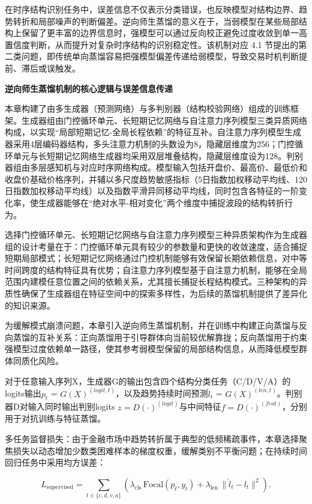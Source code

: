 在时序结构识别任务中，误差信息不仅表示分类错误，也反映模型对结构边界、趋势转折和局部噪声的判断偏差。逆向师生蒸馏的意义在于，当弱模型在某些局部结构上保留了更丰富的边界信息时，强模型可以通过反向校正避免过度收敛到单一高置信度判断，从而提升对复杂时序结构的识别稳定性。该机制对应 4.1 节提出的第二类问题，即传统单向蒸馏容易把强模型偏差传递给弱模型，导致交易时机判断提前、滞后或误触发。

\noindent\textbf{逆向师生蒸馏机制的核心逻辑与误差信息传递}\par

本章构建了由多生成器（预测网络）与多判别器（结构校验网络）组成的训练框架。生成器组由门控循环单元、长短期记忆网络与自注意力序列模型三类异质网络构成，以实现``局部短期记忆-全局长程依赖''的特征互补。自注意力序列模型生成器采用4层编码器结构，多头注意力机制的头数设为8，隐藏层维度为256；门控循环单元与长短期记忆网络生成器均采用双层堆叠结构，隐藏层维度设为128。判别器组由多层感知机与对应时序网络构成。模型输入包括开盘价、最高价、最低价和收盘价基础价格序列，并辅以多尺度趋势敏感指标（5日指数加权移动平均线、120日指数加权移动平均线）以及指数平滑异同移动平均线，同时包含各特征的一阶变化率，使生成器能够在``绝对水平-相对变化''两个维度中捕捉波段的结构转折行为。

选择门控循环单元、长短期记忆网络与自注意力序列模型三种异质架构作为生成器组的设计考量在于：门控循环单元具有较少的参数量和更快的收敛速度，适合捕捉短期局部模式；长短期记忆网络通过门控机制能够有效保留长期依赖信息，对中等时间跨度的结构特征具有优势；自注意力序列模型基于自注意力机制，能够在全局范围内建模任意位置之间的依赖关系，尤其擅长捕捉长程结构模式。三种架构的异质性确保了生成器组在特征空间中的探索多样性，为后续的蒸馏机制提供了差异化的知识来源。

为缓解模式崩溃问题，本章引入逆向师生蒸馏机制，并在训练中构建正向蒸馏与反向蒸馏的互补关系：正向蒸馏用于引导群体向当前较优解靠拢；反向蒸馏用于约束强模型过度依赖单一路径，使其参考弱模型保留的局部结构信息，从而降低模型群体同质化风险。

对于任意输入序列X，生成器G的输出包含四个结构分类任务（C/D/V/A）的logits输出$p_t$ = $G(X)^{(logit,t)}$，以及趋势持续时间预测$\hat{l}_t$ = $G(X)^{(len,t)}$。判别器D对输入同时输出判别logits $z = D(\cdot)^{(logit)}$与中间特征$f = D(\cdot)^{(feat)}$，分别用于对抗训练与特征蒸馏。

多任务监督损失：由于金融市场中趋势转折属于典型的低频稀疏事件，本章选择聚焦损失以动态增加少数类困难样本的梯度权重，缓解类别不平衡问题；在持续时间回归任务中采用均方误差：

\begin{equation}
L_{\text{supervised}}
=
\sum_{t\in\{c,d,v,a\}}
\left(
\lambda_{\text{cls}}\,
\mathrm{Focal}(p_t, y_t)
+
\lambda_{\text{len}}\,
\|\hat{l}_t - l_t\|^2
\right).
\end{equation}

